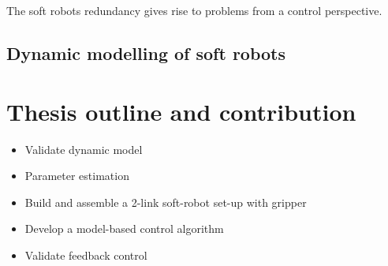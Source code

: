 The soft robots redundancy gives rise to problems from a control perspective. 

\subsection{Dynamic modelling of soft robots}



\section{Thesis outline and contribution}




\begin{itemize}
    \item Validate dynamic model
    \item Parameter estimation
    \item Build and assemble a 2-link soft-robot set-up with gripper
    \item Develop a model-based control algorithm
    \item Validate feedback control
\end{itemize}